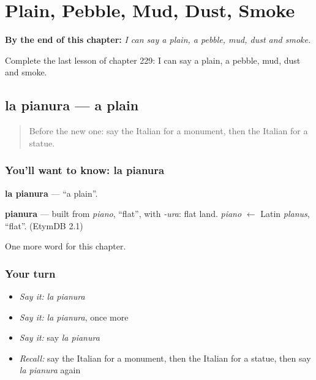 
\chapter{Plain, Pebble, Mud, Dust, Smoke}
\label{ch:it-plain-pebble-mud-dust-smoke}

\begin{chapteropening}
\textbf{By the end of this chapter:} \emph{I can say a plain, a pebble, mud, dust and smoke.}

Complete the last lesson of chapter 229: I can say a plain, a pebble, mud, dust and smoke.
\end{chapteropening}

\section[la pianura]{la pianura — a plain}

\label{lesson:IT-C229-pianura}



\begin{quote}
Before the new one: say the Italian for a monument, then the Italian for a statue.
\end{quote}

\subsection*{You'll want to know: la pianura}
\textbf{la pianura} — \textquotedblleft{}a plain\textquotedblright{}.

\begin{cousinweb}
\textbf{pianura} — built from \emph{piano}, \textquotedblleft{}flat\textquotedblright{}, with \emph{-ura}: flat land. \emph{piano} $\leftarrow$ Latin \emph{planus}, \textquotedblleft{}flat\textquotedblright{}. (EtymDB 2.1)
\end{cousinweb}

\begin{grammarlens}[title={What you've built}]
One more word for this chapter.
\end{grammarlens}

\subsection*{Your turn}
\begin{itemize}
\raggedright
  \item \emph{Say it:} \emph{la pianura}
  \item \emph{Say it:} \emph{la pianura}, once more
  \item \emph{Say it:} say \emph{la pianura}
  \item \emph{Recall:} say the Italian for a monument, then the Italian for a statue, then say \emph{la pianura} again
\end{itemize}


